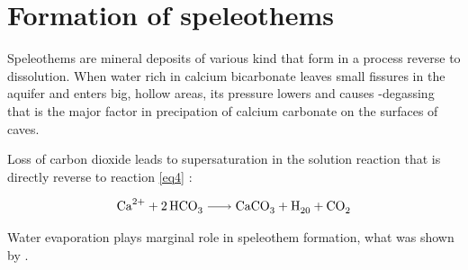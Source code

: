 \section{Formation of speleothems}

Speleothems are mineral deposits of various kind that form in a process reverse
to dissolution. When water rich in calcium bicarbonate leaves small fissures in
the aquifer and enters big, hollow areas, its pressure lowers and causes
-degassing that is the major factor in precipation of calcium carbonate
on the surfaces of caves.

Loss of carbon dioxide leads to supersaturation in the solution reaction that
is directly reverse to reaction \ref{eq4} \parencite{fairchild2012speleothem}:

\begin{equation}
  \ce{Ca^2+ + 2HCO3 -> CaCO3 + H20 + CO2}
  \label{eq:precipation}
\end{equation}

Water evaporation plays marginal role in speleothem formation, what was shown
by \cite{holland1964cave}.

